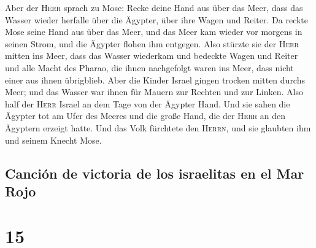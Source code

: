  Aber der \textsc{Herr} sprach zu Mose: Recke deine Hand
aus über das Meer, dass das Wasser wieder herfalle über die Ägypter,
über ihre Wagen und Reiter.  Da reckte Mose seine Hand
aus über das Meer, und das Meer kam wieder vor morgens in seinen Strom,
und die Ägypter flohen ihm entgegen. Also stürzte sie der \textsc{Herr}
mitten ins Meer,  dass das Wasser wiederkam und bedeckte
Wagen und Reiter und alle Macht des Pharao, die ihnen nachgefolgt waren
ins Meer, dass nicht einer aus ihnen übrigblieb.  Aber
die Kinder Israel gingen trocken mitten durchs Meer; und das Wasser war
ihnen für Mauern zur Rechten und zur Linken.  Also half
der \textsc{Herr} Israel an dem Tage von der Ägypter Hand. Und sie sahen
die Ägypter tot am Ufer des Meeres  und die große Hand,
die der \textsc{Herr} an den Ägyptern erzeigt hatte. Und das Volk
fürchtete den \textsc{Herrn}, und sie glaubten ihm und seinem Knecht
Mose.

\hypertarget{canciuxf3n-de-victoria-de-los-israelitas-en-el-mar-rojo}{%
\subsection{Canción de victoria de los israelitas en el Mar
Rojo}\label{canciuxf3n-de-victoria-de-los-israelitas-en-el-mar-rojo}}

\hypertarget{section-14}{%
\section{15}\label{section-14}}

